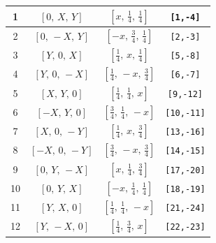 \documentclass[fleqn,8pt]{jsarticle}
\begin{document}
\begin{longtable}{cccc}
1 & $\left[ 0,\, X,\, Y \right]$ & $\left[ x,\, \frac{1}{4},\, \frac{1}{4} \right]$ & {\tt [1,-4]} \\ \hline
2 & $\left[ 0,\, - X,\, Y \right]$ & $\left[ - x,\, \frac{3}{4},\, \frac{1}{4} \right]$ & {\tt [2,-3]} \\ \hline
3 & $\left[ Y,\, 0,\, X \right]$ & $\left[ \frac{1}{4},\, x,\, \frac{1}{4} \right]$ & {\tt [5,-8]} \\ \hline
4 & $\left[ Y,\, 0,\, - X \right]$ & $\left[ \frac{1}{4},\, - x,\, \frac{3}{4} \right]$ & {\tt [6,-7]} \\ \hline
5 & $\left[ X,\, Y,\, 0 \right]$ & $\left[ \frac{1}{4},\, \frac{1}{4},\, x \right]$ & {\tt [9,-12]} \\ \hline
6 & $\left[ - X,\, Y,\, 0 \right]$ & $\left[ \frac{3}{4},\, \frac{1}{4},\, - x \right]$ & {\tt [10,-11]} \\ \hline
7 & $\left[ X,\, 0,\, - Y \right]$ & $\left[ \frac{1}{4},\, x,\, \frac{3}{4} \right]$ & {\tt [13,-16]} \\ \hline
8 & $\left[ - X,\, 0,\, - Y \right]$ & $\left[ \frac{3}{4},\, - x,\, \frac{3}{4} \right]$ & {\tt [14,-15]} \\ \hline
9 & $\left[ 0,\, Y,\, - X \right]$ & $\left[ x,\, \frac{1}{4},\, \frac{3}{4} \right]$ & {\tt [17,-20]} \\ \hline
10 & $\left[ 0,\, Y,\, X \right]$ & $\left[ - x,\, \frac{1}{4},\, \frac{1}{4} \right]$ & {\tt [18,-19]} \\ \hline
11 & $\left[ Y,\, X,\, 0 \right]$ & $\left[ \frac{1}{4},\, \frac{1}{4},\, - x \right]$ & {\tt [21,-24]} \\ \hline
12 & $\left[ Y,\, - X,\, 0 \right]$ & $\left[ \frac{1}{4},\, \frac{3}{4},\, x \right]$ & {\tt [22,-23]} \\
\end{longtable}
\renewcommand{\arraystretch}{1.2}
\end{document}

